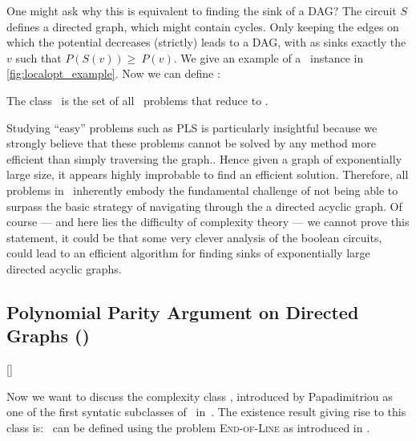 One might ask why this is equivalent to finding the sink of a DAG\@? The circuit $S$ defines a directed graph, which might contain cycles. Only keeping the edges on which the potential decreases (strictly) leads to a DAG, with as sinks exactly the $v$ such that $P(S(v)) \geq\ P(v)$. We give an example of a \Localopt\ instance in \cref{fig:localopt_example}. Now we can define \PLS:

\begin{definition}
    The class \PLS\ is the set of all \TFNP\ problems that reduce to \Localopt.
\end{definition}

Studying ``easy'' problems such as PLS is particularly insightful because we strongly believe that these problems cannot be solved by any method more efficient than simply traversing the graph.. Hence given a graph of exponentially large size, it appears highly improbable to find an efficient solution. Therefore, all problems in \PLS\ inherently embody the fundamental challenge of not being able to surpass the basic strategy of navigating through the a directed acyclic graph. Of course --- and here lies the difficulty of complexity theory --- we cannot prove this statement, it could be that some very clever analysis of the boolean circuits, could lead to an efficient algorithm for finding sinks of exponentially large directed acyclic graphs.

\subsection{Polynomial Parity Argument on Directed Graphs (\PPAD)}[\PPAD]

Now we want to discuss the complexity class \PPAD, introduced by Papadimitriou as one of the first syntatic subclasses of \TFNP\ in~. The existence result giving rise to this class is: 
\PPAD\ can be defined using the problem \textsc{End-of-Line} as introduced in .



